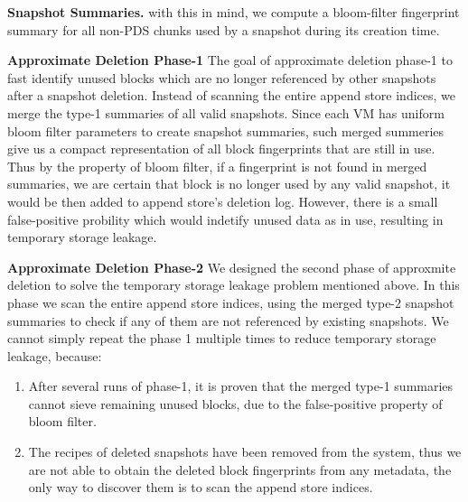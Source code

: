 
{\bf Snapshot Summaries.}
with this in mind, we compute a bloom-filter fingerprint summary for all non-PDS chunks used 
by a snapshot during  its creation time.

{\bf Approximate Deletion Phase-1}
The goal of approximate deletion phase-1 to fast identify unused blocks 
which are no longer referenced by other snapshots after a snapshot deletion.
Instead of scanning the entire append store indices, we merge the type-1 summaries of all
valid snapshots. Since each VM has uniform bloom filter parameters to create snapshot summaries, 
such merged summeries give us a compact representation of
all block fingerprints that are still in use.
Thus by the property of bloom filter, if a fingerprint is not found in merged summaries, 
we are certain that block is no longer used by any valid snapshot, it would be then added
to append store's deletion log.
However, there is a small false-positive probility which
would indetify unused data as in use, resulting in temporary storage leakage.

{\bf Approximate Deletion Phase-2}
We designed the second phase of approxmite deletion to solve the 
temporary storage leakage problem mentioned above.
In this phase we scan the entire append store indices, 
using the merged type-2 snapshot summaries to check if any of them are not
referenced by existing snapshots.
We cannot simply repeat the phase 1 multiple times to reduce temporary storage leakage, because:
\begin{enumerate} 
\item After several runs of phase-1, it is proven that the merged type-1 summaries cannot sieve remaining unused blocks, due to the false-positive property of bloom filter.
\item The recipes of deleted snapshots have been removed from the system, thus we are not able to obtain the deleted block fingerprints from any metadata, the only way to discover them is to scan the append store indices.
\end{enumerate}




